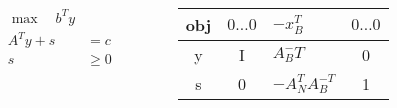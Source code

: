 \documentclass[t]{beamer}
\begin{document}
\begin{frame}
    \begin{columns}[T,onlytextwidth]

        \begin{column}{.3\textwidth}
            \begin{align*}
            \max \quad b^T y \\
            A^Ty + s &= c \\
            s &\geq 0 
            \end{align*}
        \end{column}

        \begin{column}{.6\textwidth}
            \renewcommand{\arraystretch}{2.2}
            \begin{tabular}{|c|c:>{\centering\arraybackslash}p{2.5cm}:c|}
                \hline
                obj     & $0\dots0$ & $-x_B^T$          & $0\dots0$\\\hline
                y       & I         & $A_B^-T$        & 0\\\hdashline
                s       & 0         & $-A_N^TA_B^{-T}$  & 1\\\hline
            \end{tabular}
        \end{column}        

    \end{columns}
\end{frame}
\end{document}
